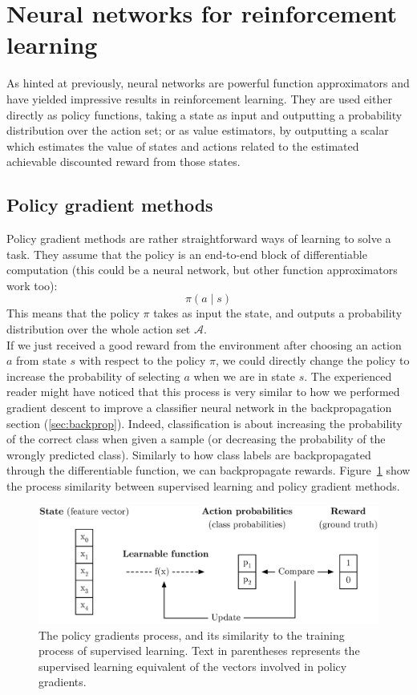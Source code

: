 \section{Neural networks for reinforcement learning}
As hinted at previously, neural networks are powerful function approximators and
have yielded impressive results in reinforcement learning. They are used either
directly as policy functions, taking a state as input and outputting a
probability distribution over the action set; or as value estimators, by 
outputting a scalar which estimates the value of states and actions related to the
estimated achievable discounted reward from those states.

\subsection{Policy gradient methods}
Policy gradient methods are rather straightforward ways of learning to solve a task.
They assume that the policy is an end-to-end block of differentiable computation
(this could be a neural network, but other function approximators work too):
$$\pi(a \mid s)$$
This means that the policy $\pi$ takes as input the state, and outputs a 
probability distribution over the whole action set $\mathcal{A}$.\\

If we just received a good reward from the environment after choosing an action
$a$ from state $s$
with respect to the policy $\pi$, we could directly change the policy to 
increase the probability of selecting $a$ when we are in state $s$. The
experienced reader might have noticed that this process is very similar to
how we performed gradient descent to improve a classifier neural network in
the backpropagation section (\ref{sec:backprop}).
Indeed, classification is about increasing the probability of the correct
class when given a sample (or decreasing the probability of the wrongly
predicted class). Similarly to how class labels are backpropagated through
the differentiable function, we can backpropagate rewards.
Figure~\ref{fig:supervised_vs_pg} show the process similarity between 
supervised learning and policy gradient methods.\\


\begin{figure}
	\centering
	\includegraphics[width=0.8\linewidth]{fig/supervised_vs_pg.eps}
	\caption{The policy gradients process, and its similarity to
	the training process of supervised learning. Text in parentheses
	represents the supervised learning equivalent of the vectors 
	involved in policy gradients.}
	\label{fig:supervised_vs_pg}
\end{figure}

